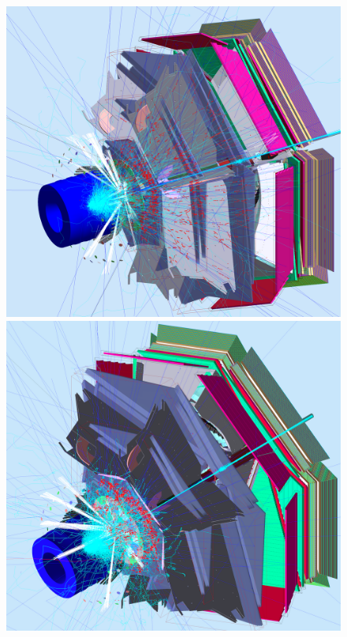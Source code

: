\documentclass[final,3p,twocolumn]{elsarticle}
\begin{document}
\begin{figure}[htbp!]
\centerline{\includegraphics[width=1.0\columnwidth]{50percentNoSolenoidNoTorus1.png}
\includegraphics[width=1.0\columnwidth]{50percentNoSolenoid2a.png}}
\vspace{0.3cm}

\end{figure}
\end{document}
